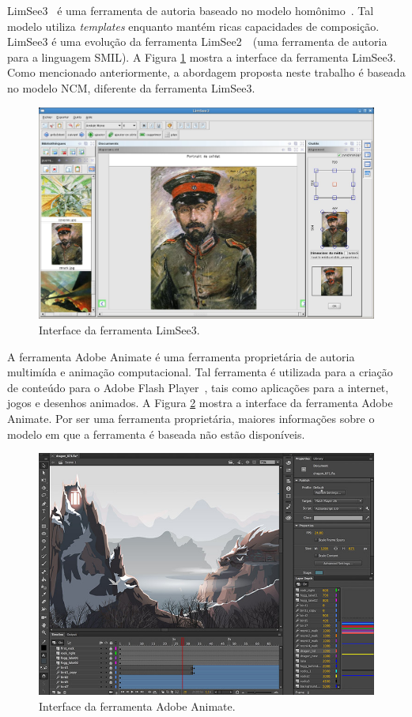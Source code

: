 \documentclass[../main.tex]{subfiles}
\begin{document}
LimSee3~\cite{quint_nouguier_2019} é uma ferramenta de autoria baseado no modelo homônimo~\cite{deltour_limsee3_2006}. Tal modelo utiliza \emph{templates} enquanto mantém ricas capacidades de composição. LimSee3 é uma evolução da ferramenta LimSee2~\cite{deltour2005limsee2}~(uma ferramenta de autoria para a linguagem SMIL). A Figura \ref{fig:limsee3} mostra a interface da ferramenta LimSee3. Como mencionado anteriormente, a abordagem proposta neste trabalho é baseada no modelo NCM, diferente da ferramenta LimSee3.

\begin{figure}[!h]
\centering
\includegraphics[width=0.5\linewidth]{IMG/Relacionados/limsee3.jpg}
\caption{Interface da ferramenta LimSee3.}
\label{fig:limsee3}
\end{figure}


A ferramenta Adobe Animate \cite{adobe_animate_2017} é uma ferramenta proprietária de autoria multimída e animação computacional. Tal ferramenta é utilizada para a criação de conteúdo para o Adobe Flash Player~\cite{adobe_flash2019}, tais como aplicações para a internet, jogos e desenhos animados. A Figura \ref{fig:adobe} mostra a interface da ferramenta Adobe Animate. Por ser uma ferramenta proprietária, maiores informações sobre o modelo em que a ferramenta é baseada não estão disponíveis.

\begin{figure}[!h]
\centering
\includegraphics[width=0.5\linewidth]{IMG/Relacionados/adobe.jpg}
\caption{Interface da ferramenta Adobe Animate.}
\label{fig:adobe}
\end{figure}
\end{document}
